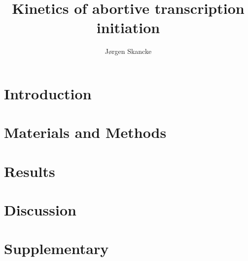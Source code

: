 \documentclass[12pt]{article}
\author{J\o rgen Skancke}
\title{Kinetics of abortive transcription initiation}
\begin{document}
\begin{abstract}

\end{abstract}

\section{Introduction}


\section{Materials and Methods}


\section{Results}


\section{Discussion}

\section{Supplementary}




\end{document}
